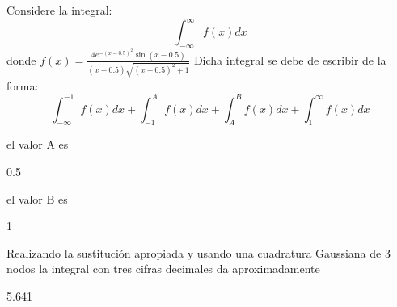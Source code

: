 \documentclass{article}
\begin{document}
\begin{quiz}{}
\begin{cloze}{}
\end{cloze}
\begin{cloze}{}
	Considere la integral:
	\[\displaystyle\int_{-\infty}^{\infty}f(x)dx\]
	donde $f(x) = \displaystyle\frac{4e^{-(x-0.5)^2}\sin(x-0.5)}{(x-0.5)\sqrt{(x-0.5)^2+1}}$
	Dicha integral se debe de escribir de la forma:
	\[\displaystyle\int_{-\infty}^{-1}f(x)dx + \displaystyle\int_{-1}^{A}f(x)dx +  \displaystyle\int_{A}^{B}f(x)dx + \displaystyle\int_{1}^{\infty}f(x)dx\]
	\begin{numerical}[points=8]{}
		el valor A es \item 0.5
	\end{numerical}
	\begin{numerical}[points=7]{}
		el valor B es \item 1
	\end{numerical}
	\begin{numerical}[points=18]{}
		Realizando la sustituci\'on apropiada y usando una cuadratura Gaussiana de 3 nodos la integral con tres cifras decimales da aproximadamente \item[tolerance=0.003] 5.641
	\end{numerical}
\end{cloze}
    \end{quiz}
\end{document}
